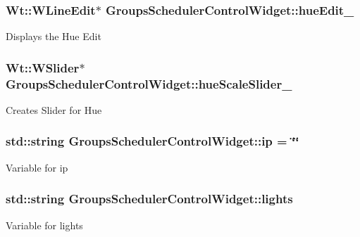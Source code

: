 \subsubsection[{\texorpdfstring{hue\+Edit\+\_\+}{hueEdit_}}]{\setlength{\rightskip}{0pt plus 5cm}Wt\+::\+W\+Line\+Edit$\ast$ Groups\+Scheduler\+Control\+Widget\+::hue\+Edit\+\_\+\hspace{0.3cm}{\ttfamily [private]}}\hypertarget{classGroupsSchedulerControlWidget_a02043bdc5496388bf38cabcc5d935279}{}\label{classGroupsSchedulerControlWidget_a02043bdc5496388bf38cabcc5d935279}
Displays the Hue Edit 
\subsubsection[{\texorpdfstring{hue\+Scale\+Slider\+\_\+}{hueScaleSlider_}}]{\setlength{\rightskip}{0pt plus 5cm}Wt\+::\+W\+Slider$\ast$ Groups\+Scheduler\+Control\+Widget\+::hue\+Scale\+Slider\+\_\+\hspace{0.3cm}{\ttfamily [private]}}\hypertarget{classGroupsSchedulerControlWidget_a659f4a8888ee667ade288dcb50bfaf93}{}\label{classGroupsSchedulerControlWidget_a659f4a8888ee667ade288dcb50bfaf93}
Creates Slider for Hue 
\subsubsection[{\texorpdfstring{ip}{ip}}]{\setlength{\rightskip}{0pt plus 5cm}std\+::string Groups\+Scheduler\+Control\+Widget\+::ip = \char`\"{}\char`\"{}\hspace{0.3cm}{\ttfamily [private]}}\hypertarget{classGroupsSchedulerControlWidget_a2ff34606703956500d57360cef9833c4}{}\label{classGroupsSchedulerControlWidget_a2ff34606703956500d57360cef9833c4}
Variable for ip 
\subsubsection[{\texorpdfstring{lights}{lights}}]{\setlength{\rightskip}{0pt plus 5cm}std\+::string Groups\+Scheduler\+Control\+Widget\+::lights\hspace{0.3cm}{\ttfamily [private]}}\hypertarget{classGroupsSchedulerControlWidget_aabfd4696b14e8e2c8e2c686e9f4063ab}{}\label{classGroupsSchedulerControlWidget_aabfd4696b14e8e2c8e2c686e9f4063ab}
Variable for lights 
